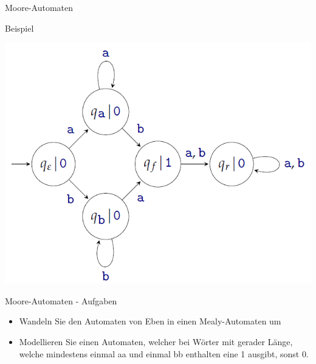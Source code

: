 	
	\begin{frame}{Moore-Automaten}
		\begin{exampleblock}{Beispiel}
			\begin{center}
				\includegraphics[scale=0.5]{graphics/10/moore.png}
			\end{center}
		\end{exampleblock}
	\end{frame}
	
	
	\begin{frame}{Moore-Automaten - Aufgaben}
		\begin{itemize}
			\item Wandeln Sie den Automaten von Eben in einen Mealy-Automaten um
			\item Modellieren Sie einen Automaten, welcher bei Wörter mit gerader Länge, welche mindestens einmal aa und einmal bb enthalten eine 1 ausgibt, sonst 0.
		\end{itemize}
	\end{frame}

		
